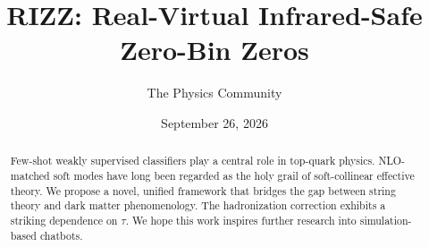 \documentclass[11pt]{article}
\title{RIZZ: Real-Virtual Infrared-Safe Zero-Bin Zeros}
\author{The Physics Community}
\date{September 26, 2026}
\begin{document}
\maketitle
\begin{abstract}
Few-shot weakly supervised classifiers play a central role in top-quark
physics. NLO-matched soft modes have long been regarded as the holy
grail of soft-collinear effective theory. We propose a novel, unified
framework that bridges the gap between string theory and dark matter
phenomenology. The hadronization correction exhibits a striking
dependence on $\tau$. We hope this work inspires further research into
simulation-based chatbots.
\end{abstract}
\tableofcontents




\nocite{*}


\end{document}
